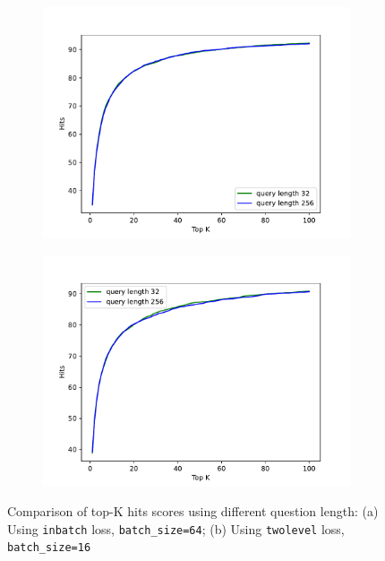 \documentclass[3p, sort&compress, 12pt]{elsarticle}
\begin{document}
\begin{figure}[!htbp]
\begin{subfigure}{.5\linewidth}
	\centering
	\includegraphics[scale=0.45]{images/PDF/experiments/inbatch_batch64.pdf}
	\caption{}
	\label{fig:19:a}
\end{subfigure}
\begin{subfigure}{.5\linewidth}
	\centering
	\includegraphics[scale=.45]{images/PDF/experiments/twolevel_batch16.pdf}
	\caption{}
	\label{fig:19:b}
\end{subfigure}
\caption{Comparison of top-K hits scores using different question length: (a) Using {\tt inbatch} loss, {\tt batch\_size=64}; (b) Using {\tt twolevel} loss, {\tt batch\_size=16}}
\label{fig:19}
\end{figure}
\end{document}
